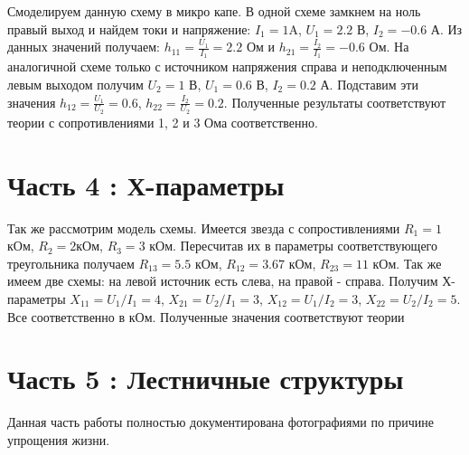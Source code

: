 \documentclass[a4paper]{article}
\begin{document}
Смоделируем данную схему в микро капе. В одной схеме замкнем на ноль правый выход и найдем токи и напряжение: $I_1 = 1 \text{A}$, $U_1 = 2.2$ В, $I_2 = -0.6$ А. Из данных значений получаем:
$h_{11} = \frac{U_1}{I_1} = 2.2$ Ом и $h_{21} = \frac{I_2}{I_1} = -0.6$ Ом. На аналогичной схеме только с источником напряжения справа и неподключенным левым выходом получим $U_2 = 1$ В, $U_1 = 0.6$ В, $I_2 = 0.2$ А. Подставим эти значения $h_{12} = \frac{U_1}{U_2} = 0.6$, $h_{22} = \frac{I_2}{U_2} = 0.2$. Полученные результаты соответствуют теории с сопротивлениями 1, 2 и 3 Ома соответственно.

\section {Часть 4 : Х-параметры}

Так же рассмотрим модель схемы. Имеется звезда с сопростивлениями $R_1 = 1$кОм, $R_2 = 2$кОм, $R_3 = 3$ кОм. Пересчитав их в параметры соответствующего треугольника получаем
$R_{13} = 5.5$ кОм, $R_{12} = 3.67$ кОм, $R_{23} = 11$ кОм. Так же имеем две схемы: на левой источник есть слева, на правой - справа.
Получим Х-параметры $X_{11} = U_1 / I_1 = 4$, $X_{21} = U_2 / I_1 = 3$, $X_{12} = U_1 / I_2 = 3$, $X_{22} = U_2 / I_2 = 5$. Все соответственно в кОм. Полученные значения соответствуют теории

\section {Часть 5 : Лестничные структуры}

Данная часть работы полностью документирована фотографиями по причине упрощения жизни.
\end{document}
